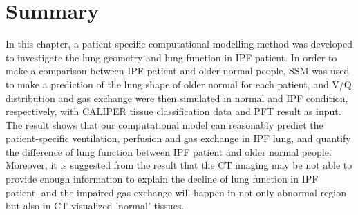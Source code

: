 \section{Summary}
In this chapter, a patient-specific computational modelling method was developed to investigate the lung geometry and lung function in IPF patient. In order to make a comparison between IPF patient and older normal people, SSM was used to make a prediction of the lung shape of older normal for each patient, and V/Q distribution and gas exchange were then simulated in normal and IPF condition, respectively, with CALIPER tissue classification data and PFT result as input. The result shows that our computational model can reasonably predict the patient-specific ventilation, perfusion and gas exchange in IPF lung, and quantify the difference of lung function between IPF patient and older normal people. Moreover, it is suggested from the result that the CT imaging may be not able to provide enough information to explain the decline of lung function in IPF patient, and the impaired gas exchange will happen in not only abnormal region but also in CT-visualized 'normal' tissues.

